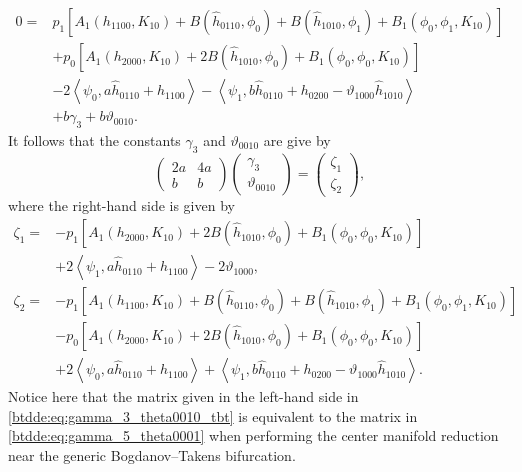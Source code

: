 \begin{align*}
0 ={}& p_1 \left[A_1(h_{1100},K_{10}) + B(\hat h_{0110},\phi_0) + B(\hat h_{1010},\phi_1) + B_1(\phi_0,\phi_1,K_{10})\right] \\
     & + p_0 \left[A_1(h_{2000},K_{10})+ 2 B(\hat h_{1010},\phi_0) + B_1(\phi_0,\phi_0,K_{10})\right] \\
     & -2\left<\psi_0, a \hat h_{0110} + h_{1100}\right> -\left<\psi_1, b \hat h_{0110} + h_{0200} - \vartheta_{1000} \hat h_{1010}\right> \\
     & + b \gamma_3 + b\vartheta_{0010}.
\end{align*}
It follows that the constants $\gamma_3$ and $\vartheta_{0010}$ are give by
\begin{equation}
\label{btdde:eq:gamma_3_theta0010_tbt}
\begin{pmatrix}
				 2a &  4a \\
				  b &   b 
\end{pmatrix}
\begin{pmatrix}
				\gamma_3 \\
				\vartheta_{0010}
\end{pmatrix}
=
\begin{pmatrix}
				\zeta_1 \\
				\zeta_2 
\end{pmatrix},
\end{equation}
where the right-hand side is given by
\begin{equation}
\label{btdde:eq:zeta1_zeta2_tbt}
\begin{aligned}
\zeta_1 ={}& -p_1\left[A_1(h_{2000},K_{10})+ 2 B(\hat h_{1010},\phi_0) + B_1(\phi_0,\phi_0,K_{10})\right] \\
           & +2\left<\psi_1,a \hat h_{0110} + h_{1100}\right> - 2\vartheta_{1000}, \\
\zeta_2 ={}& -p_1 \left[A_1(h_{1100},K_{10}) + B(\hat h_{0110},\phi_0) + B(\hat h_{1010},\phi_1) + B_1(\phi_0,\phi_1,K_{10})\right] \\
           & - p_0 \left[A_1(h_{2000},K_{10})+ 2 B(\hat h_{1010},\phi_0) + B_1(\phi_0,\phi_0,K_{10})\right] \\
           & +2\left<\psi_0, a \hat h_{0110} + h_{1100}\right> +\left<\psi_1, b \hat h_{0110} + h_{0200} - \vartheta_{1000} \hat h_{1010}\right>.
\end{aligned}
\end{equation}
Notice here that the matrix given in the left-hand side in
\cref{btdde:eq:gamma_3_theta0010_tbt} is equivalent to the matrix in
\cref{btdde:eq:gamma_5_theta0001} when performing the center manifold reduction near
the generic Bogdanov--Takens bifurcation. 

